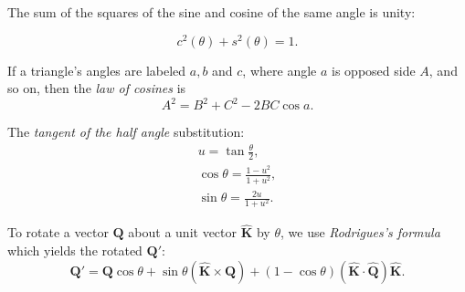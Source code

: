 The sum of the squares of the sine and cosine of the same angle is unity:

\begin{equation}
c^2(\theta) + s^2(\theta) = 1.
\end{equation}

If a triangle's angles are labeled $a, b$ and $c$, where angle $a$ is opposed side $A$, and so on, then the \emph{law of cosines} is
\begin{equation}
A^2 = B^2 + C^2 - 2BC \cos a.
\end{equation}

The \emph{tangent of the half angle} substitution:
\begin{gather}
u = \tan \frac{\theta}{2},\\
\cos\theta = \frac{1 - u^2}{1 + u^2},\\
\sin\theta = \frac{2u}{1 + u^2}.
\end{gather}

To rotate a vector $\mathbf{Q}$ about a unit vector $\hat{\mathbf{K}}$ by $\theta$, we use \emph{Rodrigues's formula} which yields the rotated ${\mathbf{Q}}'$:
\begin{equation}
{\mathbf{Q}}' = \mathbf{Q}\cos\theta + \sin\theta (\hat{\mathbf{K}} \times \mathbf{Q}) + (1 - \cos\theta) (\hat{\mathbf{K}} \cdot \hat{\mathbf{Q}}) \hat{\mathbf{K}}.
\end{equation}
